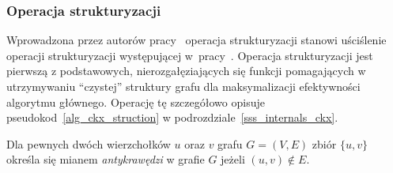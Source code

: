 \subsubsection{\textbf{Operacja strukturyzacji}}\label{sss_ckx_struction}
\par{
  Wprowadzona przez autorów pracy~\cite{ImprovedBounds10} operacja strukturyzacji stanowi uściślenie operacji strukturyzacji występującej w~pracy~\cite{Ebengger:1984}.
  Operacja strukturyzacji jest pierwszą z podstawowych, nierozgałęziających się funkcji pomagających w utrzymywaniu ``czystej'' struktury grafu dla maksymalizacji efektywności algorytmu głównego.
  Operację tę szczegółowo opisuje pseudokod~\ref{alg_ckx_struction} w podrozdziale~\ref{sss_internals_ckx}.
}
\par{
  \begin{definition}
    Dla pewnych dwóch wierzchołków $u$ oraz $v$ grafu $G=(V, E)$ zbiór $\{u, v\}$ określa się mianem \emph{antykrawędzi} w grafie $G$ jeżeli $(u, v) \notin E$.
  \end{definition}

}
